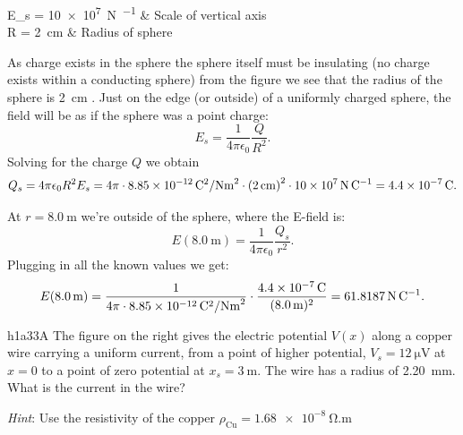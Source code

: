   \begin{givens}
    E_s = \qty{10e7}{\N\per\C}  & Scale of vertical axis \\
    R = \qty{2}{\cm} & Radius of sphere
  \end{givens}

  \begin{derivation}
    As charge exists in the sphere the sphere itself must be insulating (no charge exists within a conducting sphere) from the figure we see that the radius of the sphere is \qty{2}{\cm} .
    Just on the edge (or outside) of a uniformly charged sphere, the field will be as if the sphere was a point charge:
    \begin{equation*}
      E_s = \frac{1}{4\pi \epsilon_0} \frac{Q}{R^2}
    .\end{equation*}
    Solving for the charge $Q$ we obtain
    \begin{equation*}
      Q_s = 4 \pi \epsilon_0 R^2 E_s = 4\pi \cdot \qty{8,85e-12}{\C^2\per\N\m^2}  \cdot \left( \qty{2}{\cm}  \right)^2 \cdot \qty{10e7}{\N\per\C} = \qty{4,4e-7}{\C} 
    .\end{equation*}
    
    At $r = \qty{8,0}{\m}$ we're outside of the sphere, where the E-field is:
    \begin{equation*}
      E(\qty{8,0}{\m})= \frac{1}{4\pi \epsilon_0} \frac{Q_s}{r^2}
    .\end{equation*}
    Plugging in all the known values we get:
    \begin{equation*}
      E (\qty{8,0}{\m} )= \frac{1}{4\pi \cdot \qty{8,85e-12}{\C^2\per\N\m^2} } \cdot \frac{\qty{4,4e-7}{\C}}{(\qty{8,0}{\m}) ^2} = \qty{61,8187}{\N\per\C} 
    .\end{equation*}
  \end{derivation}


  \begin{problemwithimage}{h1a3}{3A}
    The figure on the right gives the electric potential $V(x)$ along a copper wire carrying a uniform current, from a point of higher potential, $V_s = \qty{12}{\micro\V}$ at $x = 0$ to a point of zero potential at $x_s = \qty{3}{\m}$.
    The wire has a radius of \qty{2,20}{\mm}.
    What is the current in the wire?

    \textit{Hint}: Use the resistivity of the copper $\rho_{\mathrm{Cu}} = \qty{1,68e-8}{\ohm.\m} $
  \end{problemwithimage}

